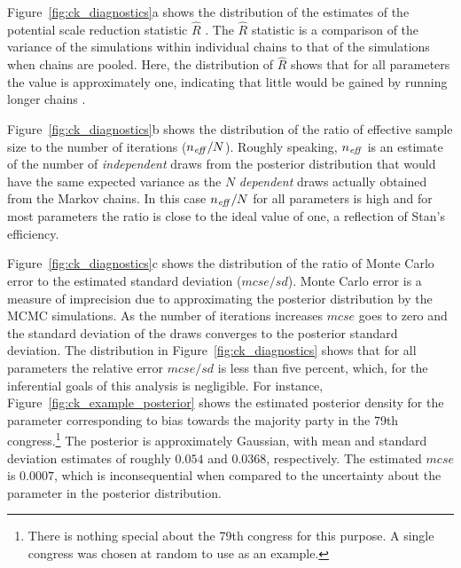 Figure~{\ref{fig:ck_diagnostics}a} shows the distribution of the estimates of the potential scale reduction statistic $\hat{R}$  . The $\hat{R}$ statistic is a comparison of the variance of the simulations within individual chains to that of the simulations when chains are pooled. Here, the distribution of $\hat{R}$ shows that for all parameters the value is approximately one, indicating that little would be gained by running longer chains . 

Figure~{\ref{fig:ck_diagnostics}b} shows the distribution of the ratio of effective sample size to the number of iterations ($n_{\it eff}/N$). Roughly speaking, $n_{\it eff}$ is an estimate of the number of {\it independent} draws from the posterior distribution that would have the same expected variance as the $N$ {\it dependent} draws actually obtained from the Markov chains. In this case $n_{\it eff}/N$ for all parameters is high and for most parameters the ratio is close to the ideal value of one, a reflection of Stan's efficiency. 


Figure~{\ref{fig:ck_diagnostics}c} shows the distribution of the ratio of Monte Carlo error to the estimated standard deviation ($mcse/sd$). Monte Carlo error is a measure of imprecision due to approximating the posterior distribution by the MCMC simulations. As the number of iterations increases $mcse$ goes to zero and the standard deviation of the draws converges to the posterior standard deviation. The distribution in Figure~\ref{fig:ck_diagnostics} shows that for all parameters the relative error $mcse/sd$ is less than five percent, which, for the inferential goals of this analysis is negligible. For instance, Figure~\ref{fig:ck_example_posterior} shows the estimated posterior density for the parameter corresponding to bias towards the majority party in the 79th congress.\footnote{There is nothing special about the 79th congress for this purpose. A single congress was chosen at random to use as an example.} The posterior is approximately Gaussian, with mean and standard deviation estimates of roughly $0.054$ and $0.0368$, respectively. The estimated $mcse$ is $0.0007$, which is inconsequential when compared to the uncertainty about the parameter in the posterior distribution.   


